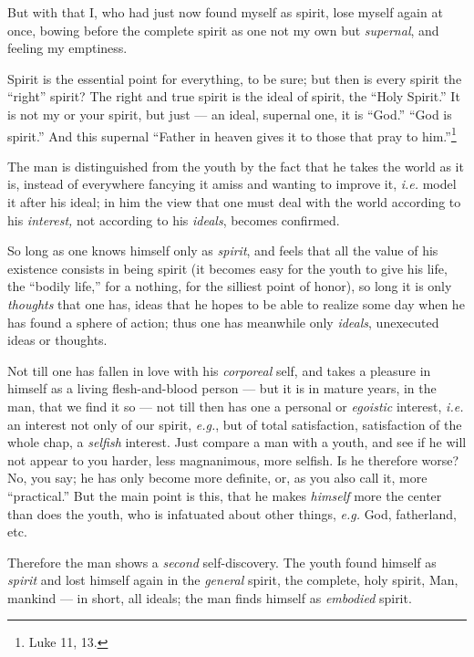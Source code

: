 But with that I, who had just now found myself as spirit, lose myself again at 
once, bowing before the complete spirit as one not my own but 
\textit{supernal}, and feeling my emptiness.

Spirit is the essential point for everything, to be sure; but then is every 
spirit the ``right'' spirit? The right and true spirit is the ideal of 
spirit, the ``Holy Spirit.'' It is not my or your spirit, but just --- an 
ideal, supernal one, it is ``God.'' ``God is spirit.'' And this supernal 
``Father in heaven gives it to those that pray to him.''\footnote{Luke 11, 
13.}

The man is distinguished from the youth by the fact that he takes the world as 
it is, instead of everywhere fancying it amiss and wanting to improve it, 
\textit{i.e.} model it after his ideal; in him the view that one must deal 
with the world according to his \textit{interest,} not according to his 
\textit{ideals}, becomes confirmed.

So long as one knows himself only as \textit{spirit}, and feels that all the 
value of his existence consists in being spirit (it becomes easy for the youth 
to give his life, the ``bodily life,'' for a nothing, for the silliest point 
of honor), so long it is only \textit{thoughts} that one has, ideas that he 
hopes to be able to realize some day when he has found a sphere of action; 
thus one has meanwhile only \textit{ideals}, unexecuted ideas or thoughts.

Not till one has fallen in love with his \textit{corporeal} self, and takes a 
pleasure in himself as a living flesh-and-blood person --- but it is in mature 
years, in the man, that we find it so --- not till then has one a personal or 
\textit{egoistic} interest, \textit{i.e.} an interest not only of our spirit, 
\textit{e.g.}, but of total satisfaction, satisfaction of the whole chap, a 
\textit{selfish} interest. Just compare a man with a youth, and see if he will 
not appear to you harder, less magnanimous, more selfish. Is he therefore 
worse? No, you say; he has only become more definite, or, as you also call it, 
more ``practical.'' But the main point is this, that he makes 
\textit{himself} more the center than does the youth, who is infatuated about 
other things, \textit{e.g.} God, fatherland, etc.

Therefore the man shows a \textit{second} self-discovery. The youth found 
himself as \textit{spirit} and lost himself again in the \textit{general} 
spirit, the complete, holy spirit, Man, mankind --- in short, all ideals; the 
man finds himself as \textit{embodied} spirit.

